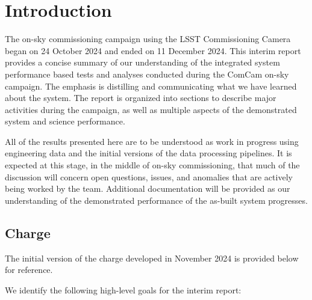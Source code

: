 \section{Introduction}
\label{sec:introduction}

The \VeraRubinObservatory on-sky commissioning campaign using the LSST Commissioning Camera \citep[LSSTComCam, hereafter ComCam;][]{10.71929/rubin/2561361} began on 24 October 2024 and ended on 11 December 2024.
This interim report provides a concise summary of our understanding of the integrated system performance based tests and analyses conducted during the ComCam on-sky campaign.
The emphasis is distilling and communicating what we have learned about the system.
The report is organized into sections to describe major activities during the campaign, as well as multiple aspects of the demonstrated system and science performance.

\begin{warning}
All of the results presented here are to be understood as work in progress using engineering data and the
initial versions of the data processing pipelines.
It is expected at this stage, in the middle of on-sky commissioning, that much of the discussion will concern open questions, issues, and anomalies that are actively being worked by the team.
Additional documentation will be provided as our understanding of the demonstrated performance of the as-built system progresses.
\end{warning}

\subsection{Charge}

\begin{note}
    The initial version of the charge developed in November 2024 is provided below for reference.
\end{note}

We identify the following high-level goals for the interim report:

